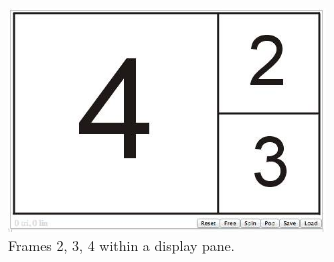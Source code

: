 \begin{figure}[H]
\centering
\includegraphics[width=0.75\textwidth]{pix/frame.jpg}
\caption{Frames 2, 3, 4 within a display pane.}
\label{fig:10}
\end{figure} 

\newpage
